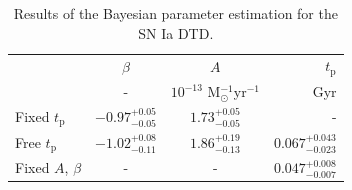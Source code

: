 \documentclass[fleqn,usenatbib]{mnras}
\begin{document}
\renewcommand{\arraystretch}{1.2}
\begin{table}
	\centering
	\caption{Results of the Bayesian parameter estimation for the SN Ia DTD.}
	\label{tab:dtd_results}
	\begin{tabular}{lccr} %
		\hline
		 &$\beta$ & $A$ & $t_{\mathrm{p}}$\\
		 &-       & $10^{-13}$ M$_{\odot}^{-1}$yr$^{-1}$ & Gyr \\
		\hline
		Fixed $t_{\mathrm{p}}$ & $-0.97_{-0.05}^{+0.05}$ &  $1.73_{-0.05}^{+0.05}$ & -\\
		Free $t_{\mathrm{p}}$ & $-1.02 _{-0.11} ^{+0.08}$ & $1.86 _{-0.13} ^{+0.19}$ & $0.067 _{-0.023} ^{+0.043}$\\
		Fixed $A$, $\beta$ & - & - & $0.047_{-0.007}^{+0.008}$\\
		\hline
	\end{tabular}
\end{table}
\end{document}
